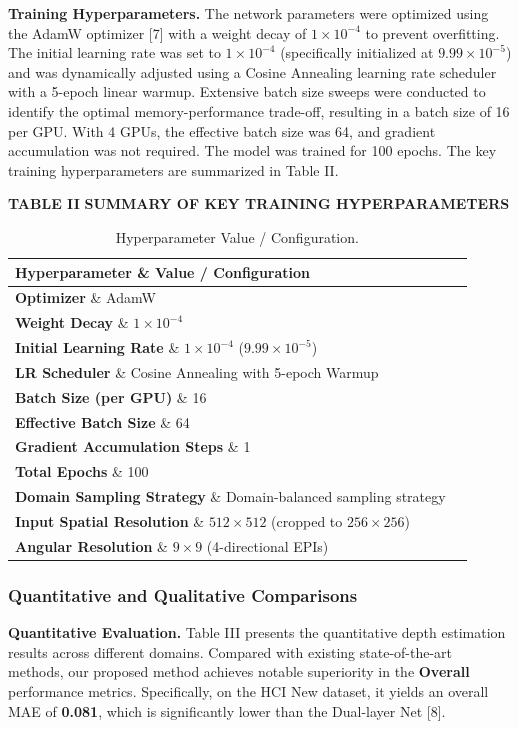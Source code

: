 \textbf{Training Hyperparameters.} 
The network parameters were optimized using the AdamW optimizer [7] with a weight decay of $1 \times 10^{-4}$ to prevent overfitting. The initial learning rate was set to $1 \times 10^{-4}$ (specifically initialized at $9.99 \times 10^{-5}$) and was dynamically adjusted using a Cosine Annealing learning rate scheduler with a 5-epoch linear warmup. Extensive batch size sweeps were conducted to identify the optimal memory-performance trade-off, resulting in a batch size of 16 per GPU. With 4 GPUs, the effective batch size was 64, and gradient accumulation was not required. The model was trained for 100 epochs. The key training hyperparameters are summarized in Table II.

\textbf{TABLE II}
\textbf{SUMMARY OF KEY TRAINING HYPERPARAMETERS}

\begin{table}[!t]
\caption{Hyperparameter Value / Configuration.}
\label{tab:table2}
\centering
\begin{tabular}{ll}
\toprule
Hyperparameter \& Value / Configuration \\
\midrule
\textbf{Optimizer} \& AdamW \\
\textbf{Weight Decay} \& $1 \times 10^{-4}$ \\
\textbf{Initial Learning Rate} \& $1 \times 10^{-4}$ ($9.99 \times 10^{-5}$) \\
\textbf{LR Scheduler} \& Cosine Annealing with 5-epoch Warmup \\
\textbf{Batch Size (per GPU)} \& 16 \\
\textbf{Effective Batch Size} \& 64 \\
\textbf{Gradient Accumulation Steps} \& 1 \\
\textbf{Total Epochs} \& 100 \\
\textbf{Domain Sampling Strategy} \& Domain-balanced sampling strategy \\
\textbf{Input Spatial Resolution} \& $512 \times 512$ (cropped to $256 \times 256$) \\
\textbf{Angular Resolution} \& $9 \times 9$ (4-directional EPIs) \\
\bottomrule
\end{tabular}
\end{table}
\subsubsection{Quantitative and Qualitative Comparisons}

\textbf{Quantitative Evaluation.} 
Table III presents the quantitative depth estimation results across different domains. Compared with existing state-of-the-art methods, our proposed method achieves notable superiority in the \textbf{Overall} performance metrics. Specifically, on the HCI New dataset, it yields an overall MAE of \textbf{0.081}, which is significantly lower than the Dual-layer Net [8]. 


